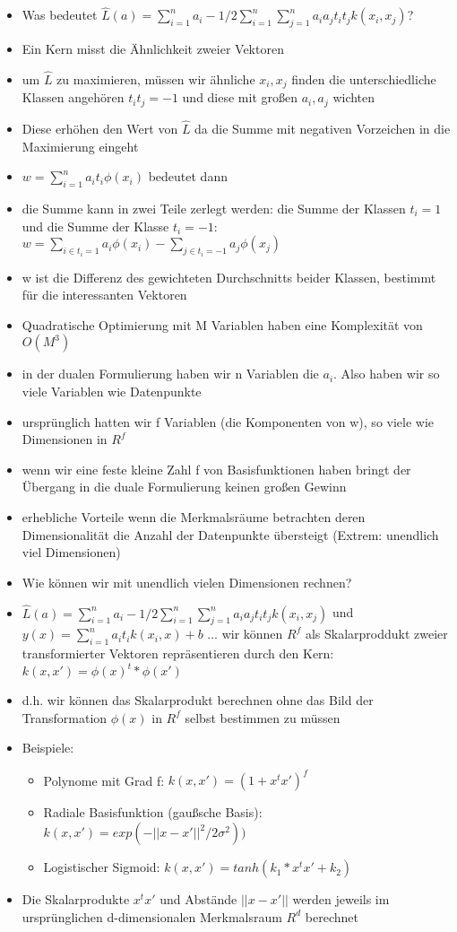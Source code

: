 \documentclass{article} %
\begin{document}
	\begin{itemize}
		\item Was bedeutet $\hat{L}(a) = \sum_{i=1}^{n}a_i-1/2\sum_{i=1}^{n}\sum_{j=1}^{n}a_ia_jt_it_jk(x_i,x_j)$?
		\item Ein Kern misst die Ähnlichkeit zweier Vektoren
		\item um $\hat{L}$ zu maximieren, müssen wir ähnliche $x_i,x_j$ finden die unterschiedliche Klassen angehören $t_it_j = -1$ und diese mit großen $a_i,a_j$ wichten
		\item Diese erhöhen den Wert von $\hat{L}$ da die Summe mit negativen Vorzeichen in die Maximierung eingeht
		\item $w = \sum_{i=1}^{n}a_it_i\phi(x_i)$ bedeutet dann
		\item die Summe kann in zwei Teile zerlegt werden: die Summe der Klassen $t_{i} = 1$ und die Summe der Klasse $t_{i} = -1$: $w = \sum_{i\in t_{i} = 1} a_i\phi(x_{i})-\sum_{j \in t_{i} = -1} a_{j}\phi(x_{j})$
		\item w ist die Differenz des gewichteten Durchschnitts beider Klassen, bestimmt für die interessanten Vektoren
		\item Quadratische Optimierung mit M Variablen haben eine Komplexität von $O(M^3)$
		\item in der dualen Formulierung haben wir n Variablen die $a_i$. Also haben wir so viele Variablen wie Datenpunkte
		\item ursprünglich hatten wir f Variablen (die Komponenten von w), so viele wie Dimensionen in $R^f$
		\item wenn wir eine feste kleine Zahl f von Basisfunktionen haben bringt der Übergang in die duale Formulierung keinen großen Gewinn
		\item erhebliche Vorteile wenn die Merkmalsräume betrachten deren Dimensionalität die Anzahl der Datenpunkte übersteigt (Extrem: unendlich viel Dimensionen)
		\item Wie können wir mit unendlich vielen Dimensionen rechnen?
		\item $\hat{L}(a) = \sum_{i=1}^{n} a_i - 1/2 \sum_{i=1}^{n}\sum_{j=1}^{n}a_ia_jt_it_jk(x_i,x_j)$ und $y(x) = \sum_{i=1}^{n} a_it_ik(x_i,x)+b$ ... wir können $R^f$ als Skalarproddukt zweier transformierter Vektoren repräsentieren durch den Kern: $k(x,x') = \phi(x)^t*\phi(x')$
		\item d.h. wir können das Skalarprodukt berechnen ohne das Bild der Transformation $\phi(x)$ in $R^f$ selbst bestimmen zu müssen
		\item Beispiele:
		\begin{itemize}
			\item Polynome mit Grad f: $k(x,x') = (1+x^tx')^f$
			\item Radiale Basisfunktion (gaußsche Basis): $k(x,x') = exp(- ||x-x'||^2/2\sigma^2))$
			\item Logistischer Sigmoid: $k(x,x') = tanh(k_1*x^tx'+k_2)$
		\end{itemize}
		\item Die Skalarprodukte $x^tx'$ und Abstände $||x-x'||$ werden jeweils im ursprünglichen d-dimensionalen Merkmalsraum $R^d$ berechnet
	\end{itemize}
\end{document}
